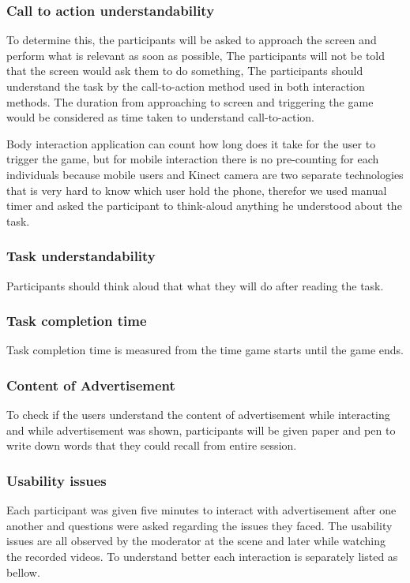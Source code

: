 \subsubsection{Call to action understandability}
To determine this, the participants will be asked to approach the screen and perform what is relevant as soon as possible, The participants will not be told that the screen would ask them to do something, The participants should understand the task by the call-to-action method used in both interaction methods. The duration from approaching to screen and triggering the game would be considered as time taken to understand call-to-action. 

Body interaction application can count how long does it take for the user to trigger the game, but for mobile interaction there is no pre-counting for each individuals because mobile users and Kinect camera are two separate technologies that is very hard to know which user hold the phone, therefor we used manual timer and asked the participant to think-aloud anything he understood about the task.

\subsubsection{Task understandability}
Participants should think aloud that what they will do after reading the task. 

\subsubsection{Task completion time}
Task completion time is measured from the time game starts until the game ends. 

\subsubsection{Content of Advertisement}
To check if the users understand the content of advertisement while interacting and while advertisement was shown, participants will be given paper and pen to write down words that they could recall from entire session.

\subsubsection{Usability issues}
Each participant was given five minutes to interact with advertisement after one another and questions were asked regarding the issues they faced.
The usability issues are all observed by the moderator at the scene and later while watching the recorded videos. To understand better each interaction is separately listed as bellow.


